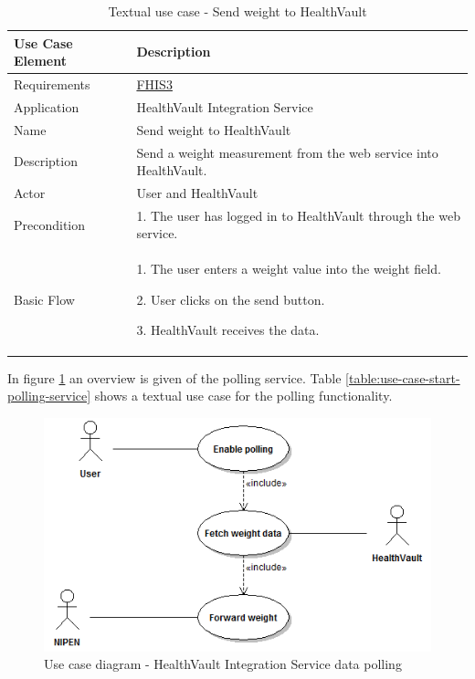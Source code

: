 \begin{table}[H]
\begin{center}
\begin{tabular}{ l | p{10cm} }
  \hline
  \textbf{Use Case Element} & \textbf{Description} \\ \hline\hline
  Requirements & \hyperref[table:reqwebservice]{FHIS3}\\ \hline
  Application & HealthVault Integration Service \\ \hline
  Name & Send weight to HealthVault \\ \hline
  Description & Send a weight measurement from the web service into HealthVault. \\ \hline
  Actor & User and HealthVault\\ \hline
  Precondition &
    \par 1. The user has logged in to HealthVault through the web service.
  \\ \hline
  Basic Flow & 
  	\par 1. The user enters a weight value into the weight field.
  	\par 2. User clicks on the send button.
  	\par 3. HealthVault receives the data.
  \\ \hline
\end{tabular}
\end{center}
\caption{Textual use case - Send weight to HealthVault}
\label{table:use-case-send-weight-to-healthvault}
\end{table}

In figure \ref{figure:use-case-diagram-weight-service-poll} an overview is given of the polling service.
Table \ref{table:use-case-start-polling-service} shows a textual use case for the polling functionality.

\begin{figure}[H]
\centering
\includegraphics[scale=0.75]{../Figures/use-case-diagram-weight-service-poll.png}
\caption{Use case diagram - HealthVault Integration Service data polling}
\label{figure:use-case-diagram-weight-service-poll}
\end{figure}

